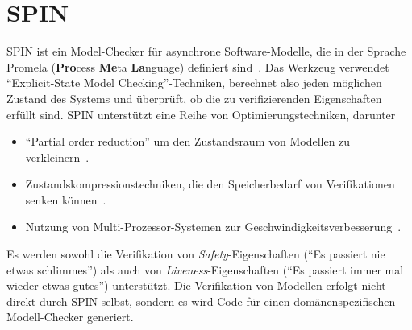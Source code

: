 \section{SPIN}
SPIN ist ein Model-Checker für asynchrone Software-Modelle, die in der Sprache Promela ({\bf Pro}cess {\bf Me}ta {\bf La}nguage) definiert sind~\cite{spinbook}.
Das Werkzeug verwendet "`Explicit-State Model Checking"'-Techniken, berechnet also jeden möglichen Zustand des Systems und überprüft, ob die zu verifizierenden Eigenschaften erfüllt sind.
SPIN unterstützt eine Reihe von Optimierungstechniken, darunter
\begin{itemize}
\item "`Partial order reduction"' um den Zustandsraum von Modellen zu verkleinern~\cite{partial_order_reduction}.
\item Zustandskompressionstechniken, die den Speicherbedarf von Verifikationen senken können~\cite{spin_state_compression}.
\item Nutzung von Multi-Prozessor-Systemen zur Geschwindigkeitsverbesserung~\cite{spin_multi_core}.
\end{itemize}
Es werden sowohl die Verifikation von \emph{Safety}-Eigenschaften ("`Es passiert nie etwas schlimmes"') als auch von \emph{Liveness}-Eigenschaften ("`Es passiert immer mal wieder etwas gutes"') unterstützt.
Die Verifikation von Modellen erfolgt nicht direkt durch SPIN selbst, sondern es wird Code für einen domänenspezifischen Modell-Checker generiert.